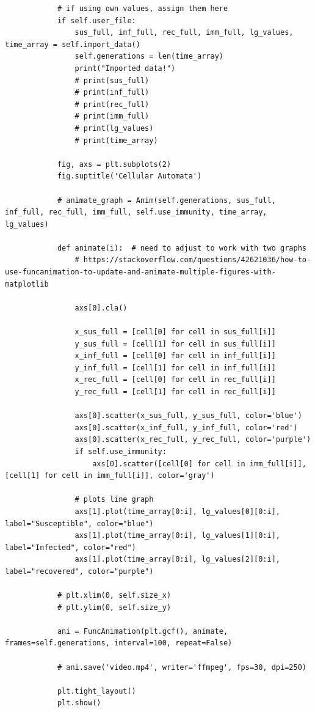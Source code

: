 \documentclass[11pt, a4paper]{article}
\begin{document}
\begin{lstlisting}
            # if using own values, assign them here
            if self.user_file:
                sus_full, inf_full, rec_full, imm_full, lg_values, time_array = self.import_data()
                self.generations = len(time_array)
                print("Imported data!")
                # print(sus_full)
                # print(inf_full)
                # print(rec_full)
                # print(imm_full)
                # print(lg_values)
                # print(time_array)
    
            fig, axs = plt.subplots(2)
            fig.suptitle('Cellular Automata')
    
            # animate_graph = Anim(self.generations, sus_full, inf_full, rec_full, imm_full, self.use_immunity, time_array, lg_values)
    
            def animate(i):  # need to adjust to work with two graphs
                # https://stackoverflow.com/questions/42621036/how-to-use-funcanimation-to-update-and-animate-multiple-figures-with-matplotlib
    
                axs[0].cla()
    
                x_sus_full = [cell[0] for cell in sus_full[i]]
                y_sus_full = [cell[1] for cell in sus_full[i]]
                x_inf_full = [cell[0] for cell in inf_full[i]]
                y_inf_full = [cell[1] for cell in inf_full[i]]
                x_rec_full = [cell[0] for cell in rec_full[i]]
                y_rec_full = [cell[1] for cell in rec_full[i]]
    
                axs[0].scatter(x_sus_full, y_sus_full, color='blue')
                axs[0].scatter(x_inf_full, y_inf_full, color='red')
                axs[0].scatter(x_rec_full, y_rec_full, color='purple')
                if self.use_immunity:
                    axs[0].scatter([cell[0] for cell in imm_full[i]], [cell[1] for cell in imm_full[i]], color='gray')
    
                # plots line graph
                axs[1].plot(time_array[0:i], lg_values[0][0:i], label="Susceptible", color="blue")
                axs[1].plot(time_array[0:i], lg_values[1][0:i], label="Infected", color="red")
                axs[1].plot(time_array[0:i], lg_values[2][0:i], label="recovered", color="purple")
    
            # plt.xlim(0, self.size_x)
            # plt.ylim(0, self.size_y)
    
            ani = FuncAnimation(plt.gcf(), animate, frames=self.generations, interval=100, repeat=False)
    
            # ani.save('video.mp4', writer='ffmpeg', fps=30, dpi=250)
    
            plt.tight_layout()
            plt.show()
    
\end{lstlisting}
\end{document}
